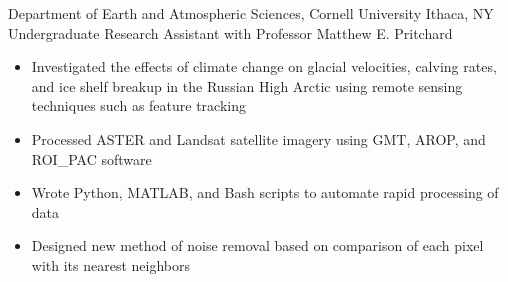 
        {Department of Earth and Atmospheric Sciences, Cornell University}
        {Ithaca, NY}
        {Undergraduate Research Assistant}
        {with Professor Matthew E. Pritchard}{
    \begin{itemize}
        \item Investigated the effects of climate change on glacial velocities, calving rates, and
            ice shelf breakup in the Russian High Arctic using remote sensing techniques such as feature tracking
        \item Processed ASTER and Landsat satellite imagery using GMT, AROP, and ROI\_PAC software
        \item Wrote Python, MATLAB, and Bash scripts to automate rapid processing of data
        \item Designed new method of noise removal based on comparison of each pixel with its nearest neighbors
    \end{itemize}
}
